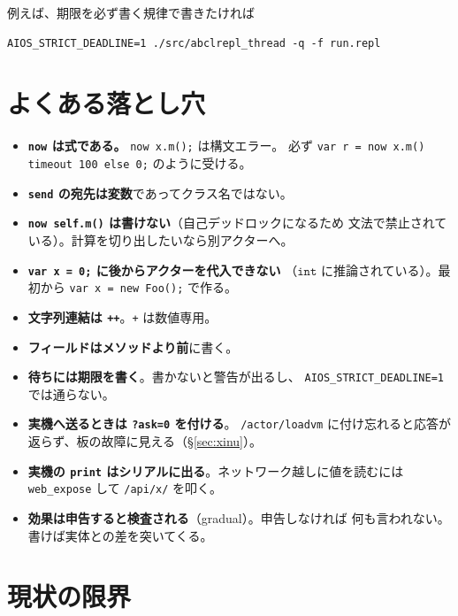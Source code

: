 \documentclass[11pt,a4paper]{ltjsarticle}
\newcommand{\ty}[1]{\ensuremath{\mathtt{#1}}}
\begin{document}
\noindent 例えば、期限を必ず書く規律で書きたければ

\begin{lstlisting}
AIOS_STRICT_DEADLINE=1 ./src/abclrepl_thread -q -f run.repl
\end{lstlisting}

\section{よくある落とし穴}

\begin{itemize}
\item \textbf{\texttt{now} は式である。} \texttt{now x.m();} は構文エラー。
  必ず \texttt{var r = now x.m() timeout 100 else 0;} のように受ける。
\item \textbf{\texttt{send} の宛先は変数}であってクラス名ではない。
\item \textbf{\texttt{now self.m()} は書けない}（自己デッドロックになるため
  文法で禁止されている）。計算を切り出したいなら別アクターへ。
\item \textbf{\texttt{var x = 0;} に後からアクターを代入できない}
  （\ty{int} に推論されている）。最初から \texttt{var x = new Foo();} で作る。
\item \textbf{文字列連結は \texttt{++}}。\texttt{+} は数値専用。
\item \textbf{フィールドはメソッドより前}に書く。
\item \textbf{待ちには期限を書く}。書かないと警告が出るし、
  \texttt{AIOS\_STRICT\_DEADLINE=1} では通らない。
\item \textbf{実機へ送るときは \texttt{?ask=0} を付ける}。
  \texttt{/actor/loadvm} に付け忘れると応答が返らず、板の故障に見える（\S\ref{sec:xinu}）。
\item \textbf{実機の \texttt{print} はシリアルに出る}。ネットワーク越しに値を読むには
  \texttt{web\_expose} して \texttt{/api/x/} を叩く。
\item \textbf{効果は申告すると検査される}（gradual）。申告しなければ
  何も言われない。書けば実体との差を突いてくる。
\end{itemize}

\section{現状の限界}
\end{document}
